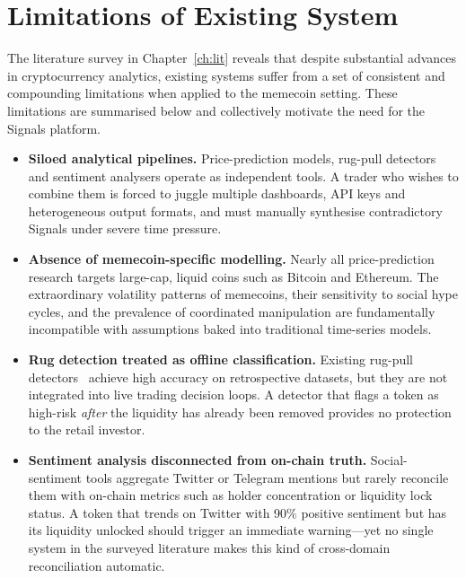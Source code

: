 \documentclass[12pt,a4paper,oneside,openany]{book}
\begin{document}
\chapter{Limitations of Existing System}
\label{ch:limit}

The literature survey in Chapter~\ref{ch:lit} reveals that despite substantial advances in cryptocurrency analytics, existing systems suffer from a set of consistent and compounding limitations when applied to the memecoin setting. These limitations are summarised below and collectively motivate the need for the Signals platform.

\begin{itemize}[leftmargin=8mm]
\item \textbf{Siloed analytical pipelines.} Price-prediction models, rug-pull detectors and sentiment analysers operate as independent tools. A trader who wishes to combine them is forced to juggle multiple dashboards, API keys and heterogeneous output formats, and must manually synthesise contradictory Signals under severe time pressure.

\item \textbf{Absence of memecoin-specific modelling.} Nearly all price-prediction research targets large-cap, liquid coins such as Bitcoin and Ethereum. The extraordinary volatility patterns of memecoins, their sensitivity to social hype cycles, and the prevalence of coordinated manipulation are fundamentally incompatible with assumptions baked into traditional time-series models.

\item \textbf{Rug detection treated as offline classification.} Existing rug-pull detectors~\cite{ref5,ref12,ref13} achieve high accuracy on retrospective datasets, but they are not integrated into live trading decision loops. A detector that flags a token as high-risk \emph{after} the liquidity has already been removed provides no protection to the retail investor.

\item \textbf{Sentiment analysis disconnected from on-chain truth.} Social-sentiment tools aggregate Twitter or Telegram mentions but rarely reconcile them with on-chain metrics such as holder concentration or liquidity lock status. A token that trends on Twitter with 90\% positive sentiment but has its liquidity unlocked should trigger an immediate warning---yet no single system in the surveyed literature makes this kind of cross-domain reconciliation automatic.


\end{itemize}
\end{document}
